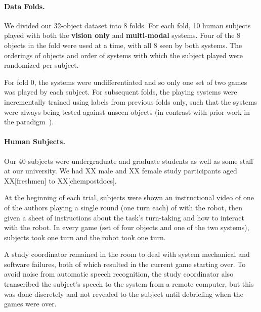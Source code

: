 \paragraph{Data Folds.}
We divided our 32-object dataset into 8 folds.
For each fold, 10 human subjects played \ispy with both the \textbf{vision only} and \textbf{multi-modal} systems.
Four of the 8 objects in the fold were used at a time, with all 8 seen by both systems.
The orderings of objects and order of systems with which the subject played were randomized per subject.

For fold 0, the systems were undifferentiated and so only one set of two games was played by each subject.
For subsequent folds, the \ispy playing systems were incrementally trained using labels from previous folds only, such that the systems were always being tested against unseen objects (in contrast with prior work in the \ispy paradigm~\cite{parde:ijcai:15}).

\paragraph{Human Subjects.}
Our 40 subjects were undergraduate and graduate students as well as some staff at our university.
We had XX male and XX female study participants aged XX[freshmen] to XX[chempostdocs].

At the beginning of each trial, subjects were shown an instructional video of one of the authors playing a single round (one turn each) of \ispy with the robot, then given a sheet of instructions about the task's turn-taking and how to interact with the robot.
In every game (set of four objects and one of the two \ispy systems), subjects took one turn and the robot took one turn.

A study coordinator remained in the room to deal with system mechanical and software failures, both of which resulted in the current game starting over.
To avoid noise from automatic speech recognition, the study coordinator also transcribed the subject's speech to the system from a remote computer, but this was done discretely and not revealed to the subject until debriefing when the games were over.